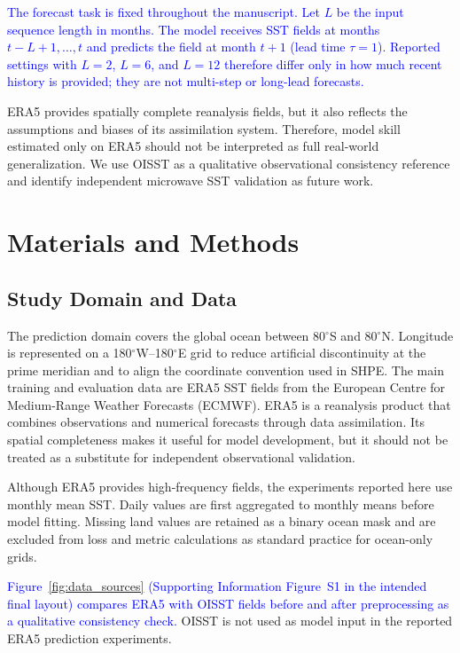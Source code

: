 \documentclass[published]{agujournal2025}
\newcommand{\rev}[1]{\textcolor{blue}{#1}}
\begin{document}
\rev{The forecast task is fixed throughout the manuscript. Let $L$ be the input sequence length in months. The model receives SST fields at months $t-L+1,\ldots,t$ and predicts the field at month $t+1$ (lead time $\tau=1$). Reported settings with $L=2$, $L=6$, and $L=12$ therefore differ only in how much recent history is provided; they are not multi-step or long-lead forecasts.}

ERA5 provides spatially complete reanalysis fields, but it also reflects the assumptions and biases of its assimilation system\cite{stockdale2011ecmwf,9324764,10243150}. Therefore, model skill estimated only on ERA5 should not be interpreted as full real-world generalization. We use OISST as a qualitative observational consistency reference and identify independent microwave SST validation as future work.

\section{Materials and Methods}

\subsection{Study Domain and Data}
The prediction domain covers the global ocean between 80$^\circ$S and 80$^\circ$N. Longitude is represented on a 180$^\circ$W--180$^\circ$E grid to reduce artificial discontinuity at the prime meridian and to align the coordinate convention used in SHPE. The main training and evaluation data are ERA5 SST fields from the European Centre for Medium-Range Weather Forecasts (ECMWF). ERA5 is a reanalysis product that combines observations and numerical forecasts through data assimilation\cite{stockdale2011ecmwf}. Its spatial completeness makes it useful for model development, but it should not be treated as a substitute for independent observational validation.

Although ERA5 provides high-frequency fields, the experiments reported here use monthly mean SST. Daily values are first aggregated to monthly means before model fitting. Missing land values are retained as a binary ocean mask and are excluded from loss and metric calculations as standard practice for ocean-only grids.

\rev{Figure~\ref{fig:data_sources} (Supporting Information Figure~S1 in the intended final layout) compares ERA5 with OISST fields before and after preprocessing as a qualitative consistency check.} OISST is not used as model input in the reported ERA5 prediction experiments.
\end{document}
